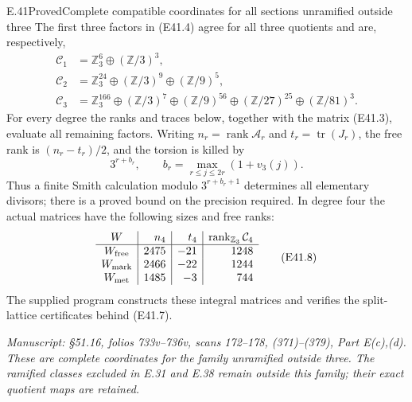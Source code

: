 \begin{statement}{E.41}{Proved}{Complete compatible coordinates for all sections unramified outside three}
The first three factors in (E41.4) agree for all three
quotients and are, respectively,
\[
\begin{split}
 \mathcal C_1&=\mathbb Z_3^6\oplus(\mathbb Z/3)^3,\\
 \mathcal C_2&=\mathbb Z_3^{24}\oplus(\mathbb Z/3)^9
                                      \oplus(\mathbb Z/9)^5,\\
 \mathcal C_3&=\mathbb Z_3^{166}\oplus(\mathbb Z/3)^7
                  \oplus(\mathbb Z/9)^{56}
                  \oplus(\mathbb Z/27)^{25}
                  \oplus(\mathbb Z/81)^3.
\end{split}
 \tag{E41.6}
\]
For every degree the ranks and traces below, together
with the matrix (E41.3), evaluate all remaining factors.
Writing $n_r=\operatorname{rank}\mathcal A_r$ and
$t_r=\operatorname{tr}(J_r)$, the free rank is
$(n_r-t_r)/2$, and the torsion is killed by
\[
 3^{r+b_r},\qquad b_r=\max_{r\le j\le2r}(1+v_3(j)).
 \tag{E41.7}
\]
Thus a finite Smith calculation modulo $3^{r+b_r+1}$
determines all elementary divisors; there is a proved
bound on the precision required. In degree four the
actual matrices have the following sizes and free ranks:
\[
\begin{array}{c|r|r|r}
 W&n_4&t_4&\operatorname{rank}_{\mathbb Z_3}\mathcal C_4\\ \hline
 W_{\rm free}&2475&-21&1248\\
 W_{\rm mark}&2466&-22&1244\\
 W_{\rm met}&1485&-3&744
\end{array}
 \tag{E41.8}
\]
The supplied program constructs these integral matrices
and verifies the split-lattice certificates behind (E41.7).

\emph{Manuscript: \S51.16, folios 733v--736v, scans 172--178,
(371)--(379), Part E(c),(d). These are complete coordinates
for the family unramified outside three. The ramified
classes excluded in E.31 and E.38 remain outside this
family; their exact quotient maps are retained.}
\end{statement}

